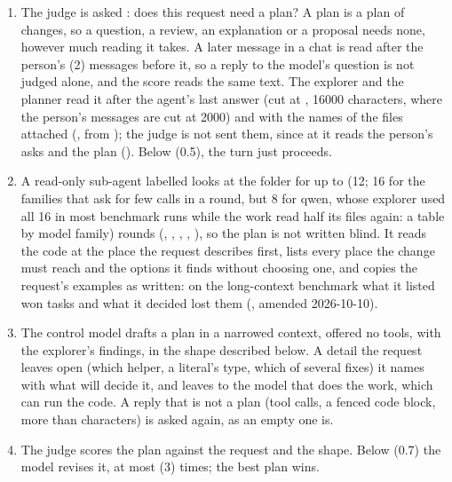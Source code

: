 \begin{enumerate}
  \item The judge is asked : does this request
    need a plan? A plan is a plan of changes, so a question, a review, an
    explanation or a proposal needs none, however much reading it takes.
    A later message in a chat is read after the person's
     (2) messages before it, so a reply to the
    model's question is not judged alone, and the score reads the same
    text. The explorer and the planner read it after the agent's last
    answer (cut at , 16000 characters, where the
    person's messages are cut at 2000) and with the names of the files attached
    (, from ); the judge
    is not sent them, since at  it reads the
    person's asks and the plan (). Below 
    (0.5), the turn just proceeds.
  \item A read-only sub-agent labelled  looks at the folder
    for up to  (12; 16 for the families that ask
    for few calls in a round, but 8 for qwen, whose explorer used all 16 in
    most benchmark runs while the work read half its files again: a table
    by model family) rounds (,
    , , ,
    ), so the plan is not
    written blind. It reads the code at the place the request describes
    first, lists every place the change must reach and the options it finds
    without choosing one, and copies the request's examples as written: on
    the long-context benchmark what it listed won tasks and what it decided
    lost them (, amended 2026-10-10).
  \item The control model drafts a plan in a narrowed context, offered no
    tools, with the explorer's findings, in the shape described below. A
    detail the request leaves open (which helper, a literal's type, which of
    several fixes) it names with what will decide it, and leaves to the model
    that does the work, which can run the code. A reply that is not a plan
    (tool calls, a fenced code block, more than 
    characters) is asked again, as an empty one is.
  \item The judge scores the plan against the request and the shape. Below
     (0.7) the model revises it, at most
     (3) times; the best plan wins.

\end{enumerate}
